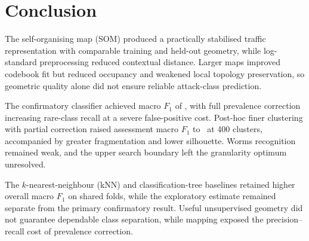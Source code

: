 \section{Conclusion}

The self-organising map (SOM) produced a practically stabilised traffic representation with comparable training and held-out geometry, while log-standard preprocessing reduced contextual distance. Larger maps improved codebook fit but reduced occupancy and weakened local topology preservation, so geometric quality alone did not ensure reliable attack-class prediction.

The confirmatory classifier achieved macro $F_1$ of \ConfirmF, with full prevalence correction increasing rare-class recall at a severe false-positive cost. Post-hoc finer clustering with partial correction raised assessment macro $F_1$ to \ExploreBF\ at 400 clusters, accompanied by greater fragmentation and lower silhouette. Worms recognition remained weak, and the upper search boundary left the granularity optimum unresolved.

The $k$-nearest-neighbour (kNN) and classification-tree baselines retained higher overall macro $F_1$ on shared folds, while the exploratory estimate remained separate from the primary confirmatory result. Useful unsupervised geometry did not guarantee dependable class separation, while mapping exposed the precision--recall cost of prevalence correction.
